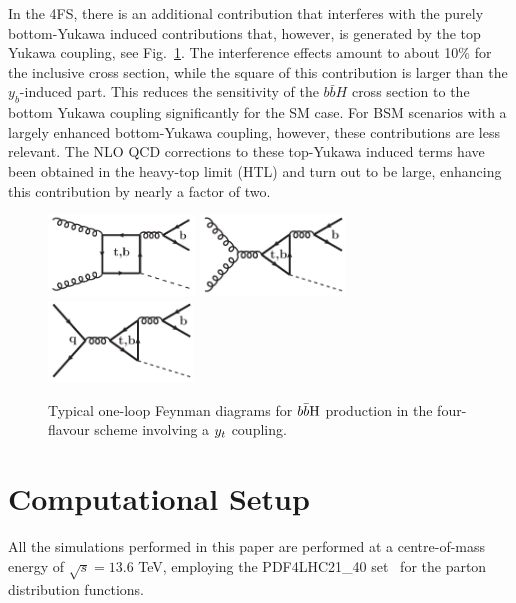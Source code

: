 \documentclass[11pt,a4paper]{article}
\begin{document}
In the 4FS, there is an additional contribution that interferes with the purely bottom-Yukawa induced contributions that, however, is generated by the top Yukawa coupling, see Fig.~\ref{fig:bbhyt}. The interference effects amount to about 10\% \cite{dittmaier:2003ej,dawson:2003kb} for the inclusive cross section, while the square of this contribution is larger than the $y_b$-induced part. This reduces the sensitivity of the $b\bar bH$ cross section to the bottom Yukawa coupling significantly for the SM case. For BSM scenarios with a largely enhanced bottom-Yukawa coupling, however, these contributions are less relevant. The NLO QCD corrections to these top-Yukawa induced terms have been obtained in the heavy-top limit (HTL) \cite{deutschmann:2018avk} and turn out to be large, enhancing this contribution by nearly a factor of two.
\begin{figure}
\begin{center}
    \includegraphics[height=2.15cm]{./diags/gg-bbH1loop2tb_4F.pdf}\hspace{1.2cm}
    \includegraphics[height=2.15cm]{./diags/gg-bbH1loop5tb.pdf}\hspace{1.2cm}
    \includegraphics[height=2.15cm]{./diags/qq-bbH1loop2tb.pdf}
  \caption{Typical one-loop Feynman diagrams for $b\bar{b}\text{H}$ production in the four-flavour scheme involving a $y_t$ coupling.}
  \label{fig:bbhyt}
\end{center}
\end{figure}

\section{Computational Setup}\label{sec:setup}
All the simulations performed in this paper are performed at a centre-of-mass energy of $\sqrt{s}=13.6$ TeV, employing the PDF4LHC21\_40 set~\cite{PDF4LHCWorkingGroup:2022cjn} for the parton distribution functions. 
\end{document}
